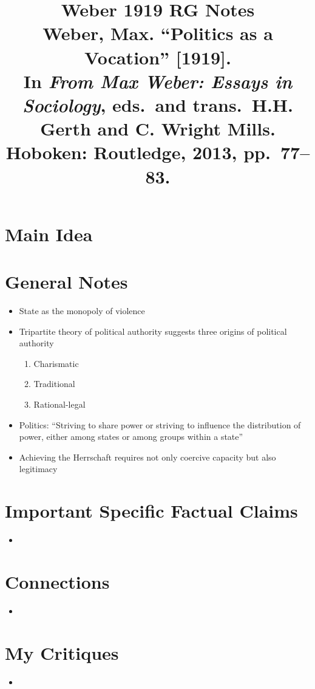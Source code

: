 \documentclass[12pt]{article}
\title{\textbf{Weber 1919 RG Notes}\\
\large Weber, Max. ``Politics as a Vocation'' [1919].\\
In \textit{From Max Weber: Essays in Sociology}, eds.\ and trans.\ H.H. Gerth and C. Wright Mills.\\
Hoboken: Routledge, 2013, pp.\ 77--83.}
\author{}
\date{}
\begin{document}
\maketitle

\section{Main Idea}



\section{General Notes}

\begin{itemize}[leftmargin=*, itemsep=4pt]
    \item State as the monopoly of violence
    \item Tripartite theory of political authority suggests three origins of political authority
    \begin{enumerate}
        \item Charismatic
        \item Traditional
        \item Rational-legal
    \end{enumerate}
    \item Politics: ``Striving to share power or striving to influence the distribution of power, either among states or among groups within a state''
    \item Achieving the Herrschaft requires not only coercive capacity but also legitimacy
\end{itemize}


\section{Important Specific Factual Claims}

\begin{itemize}[leftmargin=*, itemsep=4pt]
    \item
\end{itemize}


\section{Connections}

\begin{itemize}[leftmargin=*, itemsep=4pt]
    \item
\end{itemize}


\section{My Critiques}

\begin{itemize}[leftmargin=*, itemsep=4pt]
    \item
\end{itemize}
\end{document}
